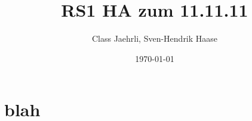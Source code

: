 \documentclass[12pt]{article}
\author{Class Jaehrli, Sven-Hendrik Haase}
\title{RS1 HA zum 11.11.11}
\date{\today}
\begin{document}
\maketitle

\section{blah}
\end{document}
